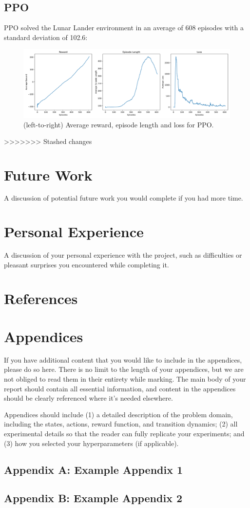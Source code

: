 \documentclass{article}
\begin{document}
\subsection{PPO}
PPO solved the Lunar Lander environment in an average of 608 episodes with a standard deviation of 102.6:
\begin{figure}[H]
  \centering
  \includegraphics[scale=0.35]{1.png}
  \caption{(left-to-right) Average reward, episode length and loss for PPO.}
\end{figure}
>>>>>>> Stashed changes
\section{Future Work}
A discussion of potential future work you would complete if you had more
time.

\section{Personal Experience}
A discussion of your personal experience with the project, such as
difficulties or pleasant surprises you encountered while completing it.


\section*{References}
\small

\normalsize
\newpage
\section*{Appendices}
If you have additional content that you would like to include in the appendices, please do so here.
There is no limit to the length of your appendices, but we are not obliged to read them in their entirety while marking. The main body of your report should contain all essential information, and content in the appendices should be clearly referenced where it's needed elsewhere.



Appendices should include (1) a detailed description of the problem domain,
including the states, actions, reward function, and transition dynamics; (2) all experimental
details so that the reader can fully replicate your experiments; and (3) how you selected your
hyperparameters (if applicable).
\subsection*{Appendix A: Example Appendix 1}
\subsection*{Appendix B: Example Appendix 2}
\end{document}
